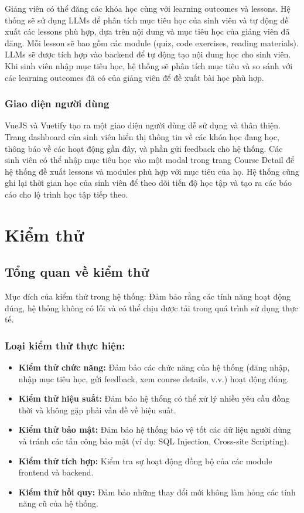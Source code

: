 Giảng viên có thể đăng các khóa học cùng với learning outcomes và lessons. Hệ thống sẽ sử dụng LLMs để phân tích mục tiêu học của sinh viên và tự động đề xuất các lessons phù hợp, dựa trên nội dung và mục tiêu học của giảng viên đã đăng. Mỗi lesson sẽ bao gồm các module (quiz, code exercises, reading materials). LLMs sẽ được tích hợp vào backend để tự động tạo nội dung học cho sinh viên. Khi sinh viên nhập mục tiêu học, hệ thống sẽ phân tích mục tiêu và so sánh với các learning outcomes đã có của giảng viên để đề xuất bài học phù hợp.

\subsubsection{Giao diện người dùng}

VueJS và Vuetify tạo ra một giao diện người dùng dễ sử dụng và thân thiện. Trang dashboard của sinh viên hiển thị thông tin về các khóa học đang học, thông báo về các hoạt động gần đây, và phần gửi feedback cho hệ thống. Các sinh viên có thể nhập mục tiêu học vào một modal trong trang Course Detail để hệ thống đề xuất lessons và modules phù hợp với mục tiêu của họ. Hệ thống cũng ghi lại thời gian học của sinh viên để theo dõi tiến độ học tập và tạo ra các báo cáo cho lộ trình học tập tiếp theo.

\section{Kiểm thử}

\subsection{Tổng quan về kiểm thử}

Mục đích của kiểm thử trong hệ thống: Đảm bảo rằng các tính năng hoạt động đúng, hệ thống không có lỗi và có thể chịu được tải trong quá trình sử dụng thực tế.

\subsubsection{Loại kiểm thử thực hiện:}
\begin{itemize}
    \item \textbf{Kiểm thử chức năng:} Đảm bảo các chức năng của hệ thống (đăng nhập, nhập mục tiêu học, gửi feedback, xem course details, v.v.) hoạt động đúng.
    \item \textbf{Kiểm thử hiệu suất:} Đảm bảo hệ thống có thể xử lý nhiều yêu cầu đồng thời và không gặp phải vấn đề về hiệu suất.
    \item \textbf{Kiểm thử bảo mật:} Đảm bảo hệ thống bảo vệ tốt các dữ liệu người dùng và tránh các tấn công bảo mật (ví dụ: SQL Injection, Cross-site Scripting).
    \item \textbf{Kiểm thử tích hợp:} Kiểm tra sự hoạt động đồng bộ của các module frontend và backend.
    \item \textbf{Kiểm thử hồi quy:} Đảm bảo những thay đổi mới không làm hỏng các tính năng cũ của hệ thống.
\end{itemize}

